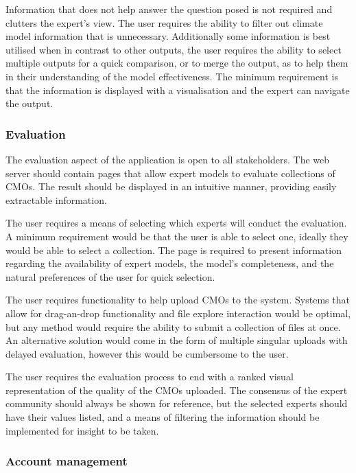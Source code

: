 \documentclass{ecmm427_assignment}
\begin{document}
 Information that does not help answer the question posed is not required and clutters the expert's view. The user requires the ability to filter out climate model information that is unnecessary. Additionally some information is best utilised when in contrast to other outputs, the user requires the ability to select multiple outputs for a quick comparison, or to merge the output, as to help them in their understanding of the model effectiveness. The minimum requirement is that the information is displayed with a visualisation and the expert can navigate the output.

\subsubsection{Evaluation}

 The evaluation aspect of the application is open to all stakeholders. The web server should contain pages that allow expert models to evaluate collections of CMOs. The result should be displayed in an intuitive manner, providing easily extractable information.

 The user requires a means of selecting which experts will conduct the evaluation. A minimum requirement would be that the user is able to select one, ideally they would be able to select a collection. The page is required to present information regarding the availability of expert models, the model's completeness, and the natural preferences of the user for quick selection.

 The user requires functionality to help upload CMOs to the system. Systems that allow for drag-an-drop functionality and file explore interaction would be optimal, but any method would require the ability to submit a collection of files at once. An alternative solution would come in the form of multiple singular uploads with delayed evaluation, however this would be cumbersome to the user.

 The user requires the evaluation process to end with a ranked visual representation of the quality of the CMOs uploaded. The consensus of the expert community should always be shown for reference, but the selected experts should have their values listed, and a means of filtering the information should be implemented for insight to be taken.

\subsubsection{Account management}
\end{document}
